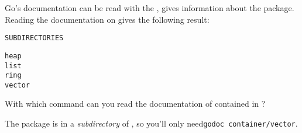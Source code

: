 \begin{Exercise}[title={Documentation},difficulty=1]
\label{ex:doc}
\Question
Go's documentation can be read with the , 
gives information about the  package. Reading the
documentation on  gives the following result:
\begin{alltt}
SUBDIRECTORIES

heap
list
ring
vector
\end{alltt}

With which  command can you read the documentation of  contained in
?

\end{Exercise}

\begin{Answer}
\Question
The package  is in a \emph{subdirectory} of
, so you'll only need\quad \texttt{godoc
container/vector}.

\end{Answer}


